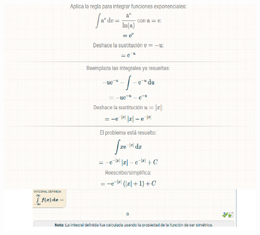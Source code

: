 \documentclass{article}
\begin{document}
        \begin{center}
            \includegraphics[scale=0.4]{proba3.png}
        \end{center}
    
\end{document}
